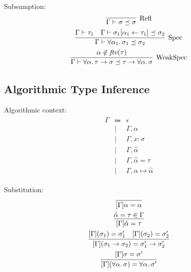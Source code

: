 Subsumption:
\begin{gather*}
  \infer[\text{Refl}]{
    \Gamma \vdash \sigma \preceq \sigma
  }{}
  \\
  \infer[\text{Spec}]{
    \Gamma \vdash \forall \alpha_1\ldotp \sigma_1 \preceq \sigma_2
  }{
    \Gamma \vdash \tau_1
    &
    \Gamma \vdash \sigma_1[\alpha_1 \assign \tau_1] \preceq \sigma_2
  }
  \\
  \infer[\text{WeakSpec}]{
    \Gamma \vdash \forall \alpha\ldotp \tau \to \sigma \preceq \tau \to \forall \alpha\ldotp\sigma
  }{
    \alpha \not\in \mathit{ftv}(\tau)
  }
\end{gather*}

\subsection{Algorithmic Type Inference}

Algorithmic context:
\begin{align*}
  \begin{array}{rcl}
    \Gamma &\Coloneq &\epsilon \\
    &\mid &\Gamma, \alpha \\
    &\mid &\Gamma, x: \sigma \\
    &\mid &\Gamma, \hat{\alpha} \\
    &\mid &\Gamma, \hat{\alpha} = \tau \\
    &\mid &\Gamma, \alpha \mapsto \hat{\alpha}
  \end{array}
\end{align*}

Substitution:
\begin{gather*}
  \infer{[\Gamma]\alpha = \alpha}{}
  \\
  \infer{[\Gamma]\hat{\alpha} = \tau}{
    \hat{\alpha} = \tau \in \Gamma
  }
  \\
  \infer{[\Gamma](\sigma_1 \to \sigma_2) = \sigma_1' \to \sigma_2'}{
    [\Gamma](\sigma_1) = \sigma_1'
    &
    [\Gamma](\sigma_2) = \sigma_2'
  }
  \\
  \infer{[\Gamma](\forall \alpha\ldotp \sigma) = \forall \alpha\ldotp \sigma'}{
    [\Gamma]\sigma = \sigma'
  }
\end{gather*}

